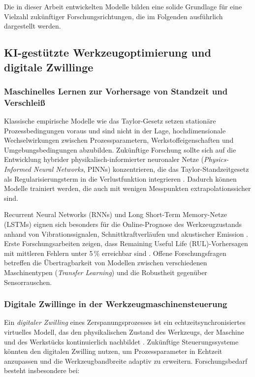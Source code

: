 ﻿\documentclass[a4paper,12pt]{article}
\theoremstyle{definition}
\begin{document}
Die in dieser Arbeit entwickelten Modelle bilden eine solide Grundlage für
eine Vielzahl zukünftiger Forschungsrichtungen, die im Folgenden ausführlich
dargestellt werden.

\subsection{KI-gestützte Werkzeugoptimierung und digitale Zwillinge}

\subsubsection{Maschinelles Lernen zur Vorhersage von Standzeit und Verschleiß}

Klassische empirische Modelle wie das Taylor-Gesetz setzen stationäre
Prozessbedingungen voraus und sind nicht in der Lage, hochdimensionale
Wechselwirkungen zwischen Prozessparametern, Werkstoffeigenschaften und
Umgebungsbedingungen abzubilden. Zukünftige Forschung sollte sich auf die
Entwicklung hybrider physikalisch-informierter neuronaler Netze
(\emph{Physics-Informed Neural Networks}, PINNs) konzentrieren, die das
Taylor-Standzeitgesetz als Regularisierungsterm in die Verlustfunktion
integrieren \cite{raissi2019}. Dadurch können Modelle trainiert werden, die
auch mit wenigen Messpunkten extrapolationssicher sind.

Recurrent Neural Networks (RNNs) und Long Short-Term Memory-Netze (LSTMs)
eignen sich besonders für die Online-Prognose des Werkzeugzustands anhand
von Vibrationssignalen, Schnittkraftverläufen und akustischer Emission
\cite{zhao2019}. Erste Forschungsarbeiten zeigen, dass Remaining Useful Life
(RUL)-Vorhersagen mit mittleren Fehlern unter 5\,\% erreichbar sind
\cite{li2019rul}. Offene Forschungsfragen betreffen die Übertragbarkeit
von Modellen zwischen verschiedenen Maschinentypen (\emph{Transfer Learning})
und die Robustheit gegenüber Sensorrauschen.

\subsubsection{Digitale Zwillinge in der Werkzeugmaschinensteuerung}

Ein \emph{digitaler Zwilling} eines Zerspanungsprozesses ist ein
echtzeitsynchronisiertes virtuelles Modell, das den physikalischen Zustand
des Werkzeugs, der Maschine und des Werkstücks kontinuierlich nachbildet
\cite{tao2018}. Zukünftige Steuerungssysteme könnten den digitalen Zwilling
nutzen, um Prozessparameter in Echtzeit anzupassen und die Werkzeugbandbreite
adaptiv zu erweitern. Forschungsbedarf besteht insbesondere bei:
\end{document}
